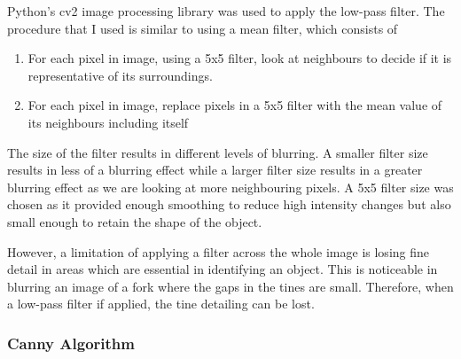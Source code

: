 Python's cv2 image processing library was used to apply the low-pass filter. The procedure that I used is similar to using a mean filter, which consists of
\begin{enumerate}
	\item For each pixel in image, using a 5x5 filter, look at neighbours to decide if it is representative of its surroundings.
	\item For each pixel in image, replace pixels in a 5x5 filter with the mean value of its neighbours including itself
\end{enumerate}
The size of the filter results in different levels of blurring. A smaller filter size results in less of a blurring effect while a larger filter size results in a greater blurring effect as we are looking at more neighbouring pixels. A 5x5 filter size was chosen as it provided enough smoothing to reduce high intensity changes but also small enough to retain the shape of the object.

However, a limitation of applying a filter across the whole image is losing fine detail in areas which are essential in identifying an object. This is noticeable in blurring an image of a fork where the gaps in the tines are small. Therefore, when a low-pass filter if applied, the tine detailing can be lost.

\subsubsection{Canny Algorithm}

